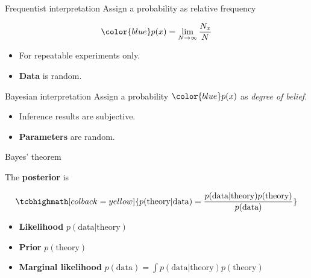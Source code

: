 \documentclass[
aspectratio=169,
14pt,
professionalfonts
]{beamer}
\begin{document}
\begin{frame}{Frequentist interpretation}
    Assign a probability as relative frequency

        $$ \color{blue}
        p(x) = \lim_{N\to\infty} \frac{N_x}{N}
        $$

        \begin{itemize}
            \item For repeatable experiments only.
            \item \textbf{Data} is random.
        \end{itemize}
\end{frame}

\begin{frame}{Bayesian interpretation}
    Assign a probability $\color{blue} p(x)$ as \textit{degree of belief}.
    \begin{itemize}
        \item Inference results are subjective.
        \item \textbf{Parameters} are random.
    \end{itemize}
\end{frame}

\begin{frame}{Bayes' theorem}

The \textbf{posterior} is

$$
\tcbhighmath[colback=yellow]{
p(\text{theory} | \text{data}) = \frac{p(\text{data}|\text{theory}) p(\text{theory})}{p(\text{data})}
}
$$

\begin{itemize}
    \item \textbf{Likelihood} $p(\text{data}|\text{theory})$
    \item \textbf{Prior} $p(\text{theory})$
    \item \textbf{Marginal likelihood} ${p(\text{data}) = \int p(\text{data}|\text{theory}) p(\text{theory})}$
\end{itemize}
\end{frame}
\end{document}
